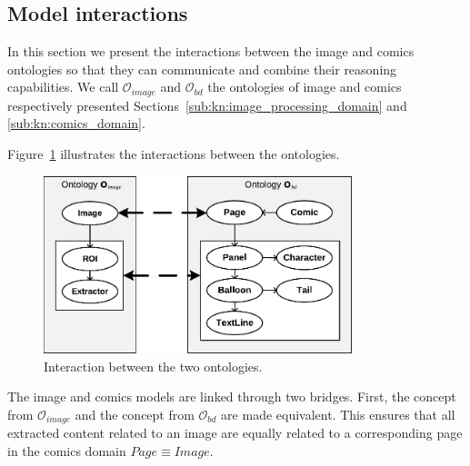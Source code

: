 
\subsection{Model interactions} %
\label{sub:model_interactions}

In this section we present the interactions between the image and comics ontologies so that they can communicate and combine their reasoning capabilities.
We call $\mathcal{O}_{image}$ and $\mathcal{O}_{bd}$ the ontologies of image and comics respectively presented Sections~\ref{sub:kn:image_processing_domain} and \ref{sub:kn:comics_domain}.


Figure~\ref{fig:kn:interactions} illustrates the interactions between the ontologies.

\begin{figure}[h!]
\begin{center}
\includegraphics[width=0.8\textwidth]{interactions.pdf}
\caption{Interaction between the two ontologies.}
\label{fig:kn:interactions}
\end{center}
\end{figure}

The image and comics models are linked through two bridges.
First, the  concept from $\mathcal{O}_{image}$ and the  concept from $\mathcal{O}_{bd}$ are made equivalent.
This ensures that all extracted content related to an image are equally related to a corresponding page in the comics domain $Page \equiv  Image$.

